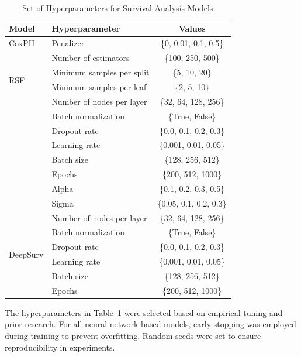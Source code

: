 \begin{table}[htbp]
\centering
\scriptsize
\setlength{\tabcolsep}{4pt}
\caption{Set of Hyperparameters for Survival Analysis Models}
\label{tab:model_hyperparameters}
\begin{tabular}{l l c}
\hline
\textbf{Model}         & \textbf{Hyperparameter}             & \textbf{Values} \\ \hline
\multirow{1}{*}{CoxPH} & Penalizer                         & \{0, 0.01, 0.1, 0.5\} \\ \hline
\multirow{4}{*}{RSF}   & Number of estimators                & \{100, 250, 500\}   \\
                       & Minimum samples per split           & \{5, 10, 20\}       \\
                       & Minimum samples per leaf            & \{2, 5, 10\}        \\ \hline
\multirow{8}{*}{DeepHit} 
                       & Number of nodes per layer           & \{32, 64, 128, 256\} \\
                       & Batch normalization                 & \{True, False\}       \\
                       & Dropout rate                        & \{0.0, 0.1, 0.2, 0.3\} \\
                       & Learning rate                       & \{0.001, 0.01, 0.05\} \\
                       & Batch size                          & \{128, 256, 512\}    \\
                       & Epochs                              & \{200, 512, 1000\}   \\
                       & Alpha                               & \{0.1, 0.2, 0.3, 0.5\} \\
                       & Sigma                               & \{0.05, 0.1, 0.2, 0.3\} \\ \hline
\multirow{6}{*}{DeepSurv} 
                       & Number of nodes per layer           & \{32, 64, 128, 256\} \\
                       & Batch normalization                 & \{True, False\}       \\
                       & Dropout rate                        & \{0.0, 0.1, 0.2, 0.3\} \\
                       & Learning rate                       & \{0.001, 0.01, 0.05\} \\
                       & Batch size                          & \{128, 256, 512\}    \\
                       & Epochs                              & \{200, 512, 1000\}   \\ \hline
\end{tabular}
\end{table}

The hyperparameters in Table~\ref{tab:model_hyperparameters} were selected based on empirical tuning and prior research.
For all neural network-based models, early stopping was employed during training to prevent overfitting.
Random seeds were set to ensure reproducibility in experiments.